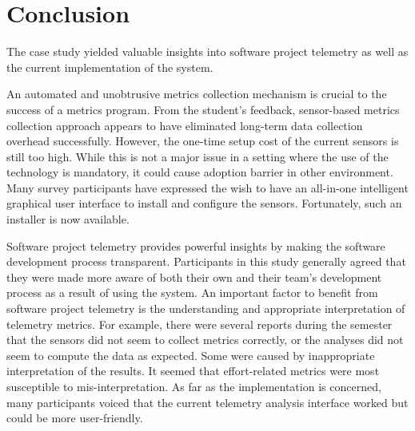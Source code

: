 



\section{Conclusion}  \label{EvaluationInClassroom:Conclusion}


The case study yielded valuable insights into software project telemetry as well as the current implementation of the system.

An automated and unobtrusive metrics collection mechanism is crucial to the success of a metrics program. From the student's feedback, sensor-based metrics collection approach appears to have eliminated long-term data collection overhead successfully. However, the one-time setup cost of the current sensors is still too high. While this is not a major issue in a setting where the use of the technology is mandatory, it could cause adoption barrier in other environment. Many survey participants have expressed the wish to have an all-in-one intelligent graphical user interface to install and configure the sensors. Fortunately, such an installer is now available.
	
Software project telemetry provides powerful insights by making the software development process transparent. Participants in this study generally agreed that they were made more aware of both their own and their team's development process as a result of using the system. An important factor to benefit from software project telemetry is the understanding and appropriate interpretation of telemetry metrics. For example, there were several reports during the semester that the sensors did not seem to collect metrics correctly, or the analyses did not seem to compute the data as expected. Some were caused by inappropriate interpretation of the results. It seemed that effort-related metrics were most susceptible to mis-interpretation. As far as the implementation is concerned, many participants voiced that the current telemetry analysis interface worked but could be more user-friendly. 		
	
